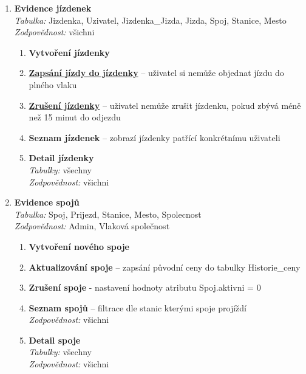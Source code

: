 \documentclass[11pt]{article}
\begin{document}
\begin{enumerate}
    \item \textbf{Evidence jízdenek}\\
        \textit{Tabulka:} Jizdenka, Uzivatel, Jizdenka\_Jizda, Jizda, Spoj, Stanice, Mesto\\
        \textit{Zodpovědnost:} všichni
        \begin{enumerate}
            \item \textbf{Vytvoření jízdenky}
            \item \underline{\textbf{Zapsání jízdy do jízdenky}} – uživatel si nemůže objednat jízdu do plného vlaku
            \item \underline{\textbf{Zrušení jízdenky}} – uživatel nemůže zrušit jízdenku, pokud zbývá méně než 15 minut do odjezdu
            \item \textbf{Seznam jízdenek} – zobrazí jízdenky patřící konkrétnímu uživateli
            \item \textbf{Detail jízdenky}\\
            \textit{Tabulky:} všechny\\
            \textit{Zodpovědnost:} všichni
        \end{enumerate}
        
\newpage

    \item \textbf{Evidence spojů}\\
        \textit{Tabulka:} Spoj, Prijezd, Stanice, Mesto, Spolecnost\\
        \textit{Zodpovědnost:} Admin, Vlaková společnost
        \begin{enumerate}
            \item \textbf{Vytvoření nového spoje}
            \item \textbf{Aktualizování spoje} – zapsání původní ceny do tabulky Historie\_ceny
            \item \textbf{Zrušení spoje} - nastavení hodnoty atributu Spoj.aktivni = 0
            \item \textbf{Seznam spojů} – filtrace dle stanic kterými spoje projíždí\\
            \textit{Zodpovědnost:} všichni
            \item \textbf{Detail spoje}\\
            \textit{Tabulky:} všechny\\
            \textit{Zodpovědnost:} všichni
        \end{enumerate}


\end{enumerate}
\end{document}
